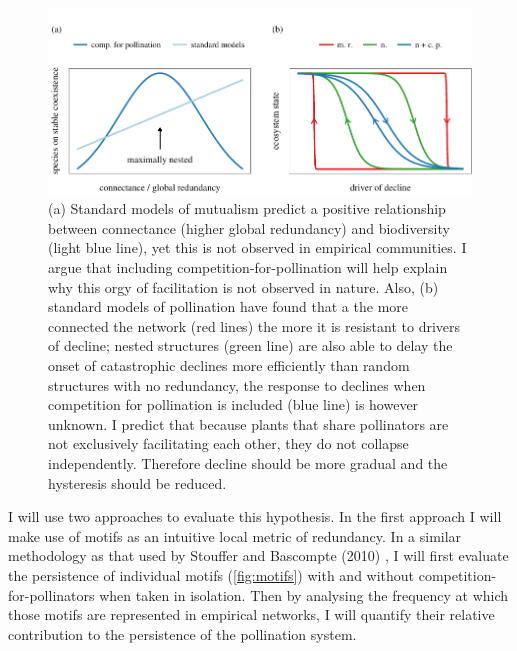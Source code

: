 \documentclass[a4paper]{article}
\begin{document}
\begin{figure}[tbp]
  \centering
  \includegraphics{hypo_c2}
  \caption{
  \label{fig:hypo_c2}
  (a) Standard models of mutualism predict a positive relationship between connectance (higher global redundancy) and biodiversity (light blue line), yet this is not observed in empirical communities. I argue that including competition-for-pollination will help explain why this orgy of facilitation is not observed in nature.
  Also, (b) standard models of pollination have found that a the more connected the network (red lines) the more it is resistant to drivers of decline; nested structures (green line) are also able to delay the onset of catastrophic declines more efficiently than random structures with no redundancy, the response to declines when competition for pollination is included (blue line) is however unknown.
  I predict that because plants that share pollinators are not exclusively facilitating each other, they do not collapse independently.
  Therefore decline should be more gradual and the hysteresis should be reduced.
  }
\end{figure}

I will use two approaches to evaluate this hypothesis.
In the first approach I will make use of motifs as an intuitive local metric of redundancy.
In a similar methodology as that used by Stouffer and Bascompte (2010) \autocite{Stouffer2010}, I will first evaluate the persistence of individual motifs (\autoref{fig:motifs}) with and without competition-for-pollinators when taken in isolation.
Then by analysing the frequency at which those motifs are represented in empirical networks, I will quantify their relative contribution to the persistence  of the pollination system.
\end{document}
